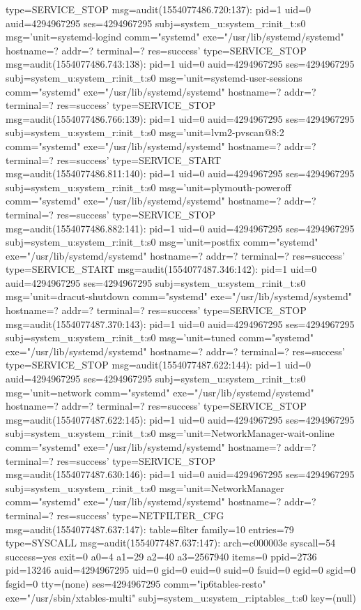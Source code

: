 \documentclass[]{report}
\newenvironment{Shaded}{}{}
\newcommand{\NormalTok}[1]{#1}
\begin{document}
\begin{Shaded}
\begin{Highlighting}[]
\NormalTok{type=SERVICE_STOP msg=audit(1554077486.720:137): pid=1 uid=0 auid=4294967295 ses=4294967295 subj=system_u:system_r:init_t:s0 msg='unit=systemd-logind comm="systemd" exe="/usr/lib/systemd/systemd" hostname=? addr=? terminal=? res=success'}
\NormalTok{type=SERVICE_STOP msg=audit(1554077486.743:138): pid=1 uid=0 auid=4294967295 ses=4294967295 subj=system_u:system_r:init_t:s0 msg='unit=systemd-user-sessions comm="systemd" exe="/usr/lib/systemd/systemd" hostname=? addr=? terminal=? res=success'}
\NormalTok{type=SERVICE_STOP msg=audit(1554077486.766:139): pid=1 uid=0 auid=4294967295 ses=4294967295 subj=system_u:system_r:init_t:s0 msg='unit=lvm2-pvscan@8:2 comm="systemd" exe="/usr/lib/systemd/systemd" hostname=? addr=? terminal=? res=success'}
\NormalTok{type=SERVICE_START msg=audit(1554077486.811:140): pid=1 uid=0 auid=4294967295 ses=4294967295 subj=system_u:system_r:init_t:s0 msg='unit=plymouth-poweroff comm="systemd" exe="/usr/lib/systemd/systemd" hostname=? addr=? terminal=? res=success'}
\NormalTok{type=SERVICE_STOP msg=audit(1554077486.882:141): pid=1 uid=0 auid=4294967295 ses=4294967295 subj=system_u:system_r:init_t:s0 msg='unit=postfix comm="systemd" exe="/usr/lib/systemd/systemd" hostname=? addr=? terminal=? res=success'}
\NormalTok{type=SERVICE_START msg=audit(1554077487.346:142): pid=1 uid=0 auid=4294967295 ses=4294967295 subj=system_u:system_r:init_t:s0 msg='unit=dracut-shutdown comm="systemd" exe="/usr/lib/systemd/systemd" hostname=? addr=? terminal=? res=success'}
\NormalTok{type=SERVICE_STOP msg=audit(1554077487.370:143): pid=1 uid=0 auid=4294967295 ses=4294967295 subj=system_u:system_r:init_t:s0 msg='unit=tuned comm="systemd" exe="/usr/lib/systemd/systemd" hostname=? addr=? terminal=? res=success'}
\NormalTok{type=SERVICE_STOP msg=audit(1554077487.622:144): pid=1 uid=0 auid=4294967295 ses=4294967295 subj=system_u:system_r:init_t:s0 msg='unit=network comm="systemd" exe="/usr/lib/systemd/systemd" hostname=? addr=? terminal=? res=success'}
\NormalTok{type=SERVICE_STOP msg=audit(1554077487.622:145): pid=1 uid=0 auid=4294967295 ses=4294967295 subj=system_u:system_r:init_t:s0 msg='unit=NetworkManager-wait-online comm="systemd" exe="/usr/lib/systemd/systemd" hostname=? addr=? terminal=? res=success'}
\NormalTok{type=SERVICE_STOP msg=audit(1554077487.630:146): pid=1 uid=0 auid=4294967295 ses=4294967295 subj=system_u:system_r:init_t:s0 msg='unit=NetworkManager comm="systemd" exe="/usr/lib/systemd/systemd" hostname=? addr=? terminal=? res=success'}
\NormalTok{type=NETFILTER_CFG msg=audit(1554077487.637:147): table=filter family=10 entries=79}
\NormalTok{type=SYSCALL msg=audit(1554077487.637:147): arch=c000003e syscall=54 success=yes exit=0 a0=4 a1=29 a2=40 a3=2567940 items=0 ppid=2736 pid=13246 auid=4294967295 uid=0 gid=0 euid=0 suid=0 fsuid=0 egid=0 sgid=0 fsgid=0 tty=(none) ses=4294967295 comm="ip6tables-resto" exe="/usr/sbin/xtables-multi" subj=system_u:system_r:iptables_t:s0 key=(null)}

\end{Highlighting}
\end{Shaded}
\end{document}
